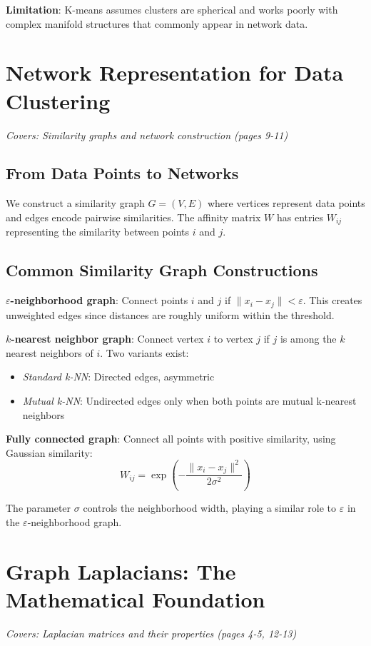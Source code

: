 \documentclass[11pt]{article}
\begin{document}
\textbf{Limitation}: K-means assumes clusters are spherical and works poorly with complex manifold structures that commonly appear in network data.

\section{Network Representation for Data Clustering}
\textit{Covers: Similarity graphs and network construction (pages 9-11)}

\subsection{From Data Points to Networks}
We construct a similarity graph $G = (V, E)$ where vertices represent data points and edges encode pairwise similarities. The affinity matrix $W$ has entries $W_{ij}$ representing the similarity between points $i$ and $j$.

\subsection{Common Similarity Graph Constructions}

\textbf{$\varepsilon$-neighborhood graph}: Connect points $i$ and $j$ if $\|x_i - x_j\| < \varepsilon$. This creates unweighted edges since distances are roughly uniform within the threshold.

\textbf{$k$-nearest neighbor graph}: Connect vertex $i$ to vertex $j$ if $j$ is among the $k$ nearest neighbors of $i$. Two variants exist:
\begin{itemize}
\item \textit{Standard k-NN}: Directed edges, asymmetric
\item \textit{Mutual k-NN}: Undirected edges only when both points are mutual k-nearest neighbors
\end{itemize}

\textbf{Fully connected graph}: Connect all points with positive similarity, using Gaussian similarity:
$$W_{ij} = \exp\left(-\frac{\|x_i - x_j\|^2}{2\sigma^2}\right)$$

The parameter $\sigma$ controls the neighborhood width, playing a similar role to $\varepsilon$ in the $\varepsilon$-neighborhood graph.

\section{Graph Laplacians: The Mathematical Foundation}
\textit{Covers: Laplacian matrices and their properties (pages 4-5, 12-13)}
\end{document}
